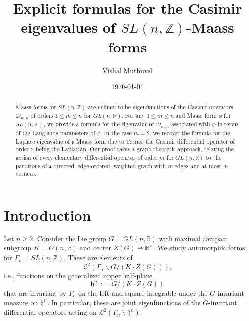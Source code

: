 \documentclass[12pt, reqno, oneside]{amsart}
\title[Explicit formulas for Casimir eigenvalues of Maass forms]{Explicit formulas for the Casimir eigenvalues of $SL(n,\mathbb{Z})$-Maass forms}
\author{Vishal Muthuvel}
\date{\today}
\numberwithin{equation}{section}
\begin{document}
\begingroup

%
%

\begin{abstract}

Maass forms for $SL(n,\mathbb{Z})$ are defined to be eigenfunctions of the Casimir operators $\mathcal{D}_{m,n}$ of orders $1 \leq m \leq n$ for $GL(n,\mathbb{R})$. For any $1 \leq m \leq n$ and Maass form $\phi$ for $SL(n,\mathbb{Z})$, we provide a formula for the eigenvalue of $\mathcal{D}_{m,n}$ associated with $\phi$ in terms of the Langlands parameters of $\phi$. In the case $m=2$, we recover the formula for the Laplace eigenvalue of a Maass form due to Terras, the Casimir differential operator of order $2$ being the Laplacian. Our proof takes a graph-theoretic approach, relating the action of every elementary differential operator of order $m$ for $GL(n,\mathbb{R})$ to the partitions of a directed, edge-ordered, weighted graph with $m$ edges and at most $m$ vertices. 

\end{abstract}

\maketitle

\vspace*{-0.75cm}

\tableofcontents

\vspace*{-1.25cm}

%
%

\section{Introduction}

Let $n \geq 2$. Consider the Lie group $G = GL(n,\mathbb{R})$ with maximal compact subgroup $K = O(n,\mathbb{R})$ and center $Z(G) \cong \mathbb{R}^\times$. We study automorphic forms for $\Gamma_n = SL(n,\mathbb{Z})$. These are elements of 
\begin{equation*}
\mathcal{L}^2 \left( \Gamma_n \backslash G / (K \cdot Z(G)) \right),
\end{equation*}
i.e., functions on the generalized upper half-plane
\begin{equation*}
\mathfrak{h}^n \ := \ G / (K \cdot Z(G))
\end{equation*}
that are invariant by $\Gamma_n$ on the left and square-integrable under the $G$-invariant measure on $\mathfrak{h}^n$. In particular, these are joint eigenfunctions of the $G$-invariant differential operators acting on $\mathcal{L}^2 \left( \Gamma_n \backslash \mathfrak{h}^n \right)$. 
\end{document}

